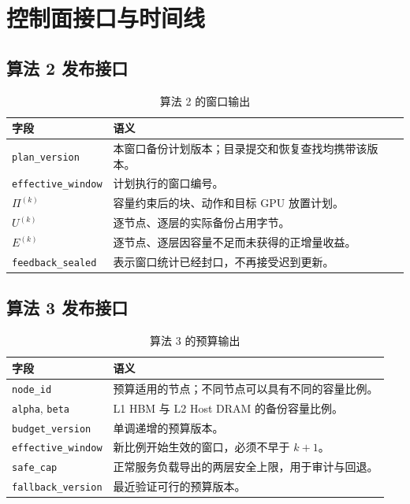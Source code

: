 \documentclass[UTF8,11pt,a4paper,fontset=fandol]{ctexart}
\newcommand{\code}[1]{\texttt{#1}}
\begin{document}
\section{控制面接口与时间线}

\subsection{算法 2 发布接口}

\begin{table}[H]
  \centering
  \caption{算法 2 的窗口输出}
  \label{tab:algorithm2-output}
  \begin{tabularx}{\textwidth}{p{}X}
    \toprule
    字段 & 语义 \\
    \midrule
    \code{plan\_version}
      & 本窗口备份计划版本；目录提交和恢复查找均携带该版本。 \\
    \code{effective\_window}
      & 计划执行的窗口编号。 \\
    $\Pi^{(k)}$
      & 容量约束后的块、动作和目标 GPU 放置计划。 \\
    $U^{(k)}$
      & 逐节点、逐层的实际备份占用字节。 \\
    $E^{(k)}$
      & 逐节点、逐层因容量不足而未获得的正增量收益。 \\
    \code{feedback\_sealed}
      & 表示窗口统计已经封口，不再接受迟到更新。 \\
    \bottomrule
  \end{tabularx}
\end{table}

\subsection{算法 3 发布接口}

\begin{table}[H]
  \centering
  \caption{算法 3 的预算输出}
  \label{tab:algorithm3-output}
  \begin{tabularx}{\textwidth}{p{}X}
    \toprule
    字段 & 语义 \\
    \midrule
    \code{node\_id}
      & 预算适用的节点；不同节点可以具有不同的容量比例。 \\
    \code{alpha}, \code{beta}
      & L1 HBM 与 L2 Host DRAM 的备份容量比例。 \\
    \code{budget\_version}
      & 单调递增的预算版本。 \\
    \code{effective\_window}
      & 新比例开始生效的窗口，必须不早于 $k+1$。 \\
    \code{safe\_cap}
      & 正常服务负载导出的两层安全上限，用于审计与回退。 \\
    \code{fallback\_version}
      & 最近验证可行的预算版本。 \\
    \bottomrule
  \end{tabularx}
\end{table}
\end{document}
